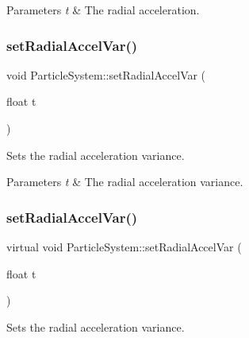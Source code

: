 \begin{DoxyParams}{Parameters}
{\em t} & The radial acceleration. \\
\hline
\end{DoxyParams}
\mbox{\label{classParticleSystem_a54a5c8d241e2391202d236085fb125c8}} 
\subsubsection{\texorpdfstring{set\+Radial\+Accel\+Var()}{setRadialAccelVar()}\hspace{0.1cm}{\footnotesize\ttfamily [1/2]}}
{\footnotesize\ttfamily void Particle\+System\+::set\+Radial\+Accel\+Var (\begin{DoxyParamCaption}\item[{float}]{t }\end{DoxyParamCaption})\hspace{0.3cm}{\ttfamily [virtual]}}

Sets the radial acceleration variance.


\begin{DoxyParams}{Parameters}
{\em t} & The radial acceleration variance. \\
\hline
\end{DoxyParams}
\mbox{\label{classParticleSystem_a196919735a577b95e4ffe40d1844c08b}} 
\subsubsection{\texorpdfstring{set\+Radial\+Accel\+Var()}{setRadialAccelVar()}\hspace{0.1cm}{\footnotesize\ttfamily [2/2]}}
{\footnotesize\ttfamily virtual void Particle\+System\+::set\+Radial\+Accel\+Var (\begin{DoxyParamCaption}\item[{float}]{t }\end{DoxyParamCaption})\hspace{0.3cm}{\ttfamily [virtual]}}

Sets the radial acceleration variance.


